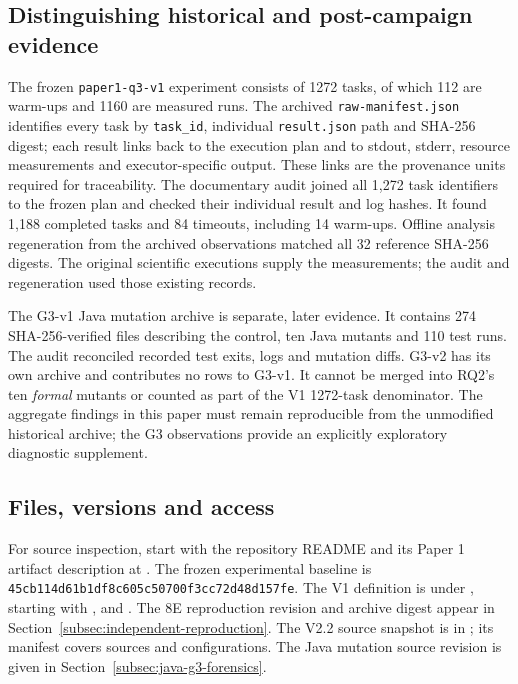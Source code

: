 \subsection{Distinguishing historical and post-campaign evidence}
\label{subsec:artifact-two-populations}

The frozen \texttt{paper1-q3-v1} experiment consists of 1272 tasks, of which
112 are warm-ups and 1160 are measured runs. The archived
\texttt{raw-manifest.json} identifies every task by \texttt{task\_id},
individual \texttt{result.json} path and SHA-256 digest; each result links
back to the execution plan and to stdout, stderr, resource measurements and
executor-specific output. These links are the provenance units required for
traceability. The documentary audit joined all 1,272 task identifiers to
the frozen plan and checked their individual result and log hashes.
It found 1,188 completed tasks and 84 timeouts, including 14 warm-ups.
Offline analysis regeneration from the archived observations matched all
32 reference SHA-256 digests. The original scientific executions supply
the measurements; the audit and regeneration used those existing records.

The G3-v1 Java mutation archive is separate, later evidence. It contains 274
SHA-256-verified files describing the control, ten Java mutants and 110 test
runs. The audit reconciled recorded test exits, logs and mutation diffs.
G3-v2 has its own archive and contributes no rows to G3-v1. It cannot be merged into RQ2's ten \emph{formal} mutants or counted as
part of the V1 1272-task denominator. The aggregate findings in this paper
must remain reproducible from the unmodified historical archive; the G3
observations provide an explicitly exploratory diagnostic supplement.

\subsection{Files, versions and access}
\label{subsec:artifact-access}

For source inspection, start with the repository README and its Paper 1
artifact description at
.
The frozen experimental baseline is
\nolinkurl{45cb114d61b1df8c605c50700f3cc72d48d157fe}.
The V1 definition is under , starting with
,  and
. The 8E reproduction revision and archive
digest appear in Section~\ref{subsec:independent-reproduction}.
The V2.2 source snapshot is in
; its manifest covers sources and
configurations. The Java mutation source revision is given in
Section~\ref{subsec:java-g3-forensics}.

